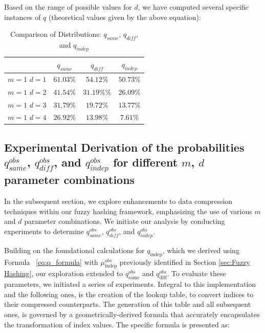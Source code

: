 Based on the range of possible values for \(d\), we have computed several specific instances of \(q\) (theoretical values given by the above equation):
\begin{table}[H]
    \centering
    \renewcommand{\arraystretch}{1.25}\begin{tabular}{|c|c|c|c|}
        \hline
        & $q_{same}$ & $q_{diff}$ & $q_{indep}$\\
        \hline
        \(m = 1\) \(d = 1\) & $61.03\%$ & $54.12\%$ & $50.73\%$\\
        \(m = 1\) \(d = 2\) & $41.54\%$ & $31.19\%\%$ & $26.09\%$\\
        \(m = 1\) \(d = 3\) & $31.79\%$ & $19.72\%$ & $13.77\%$\\
        \(m = 1\) \(d = 4\) & $26.92\%$ & $13.98\%$ & $7.61\%$\\
        \hline
    \end{tabular}
\caption{Comparison of Distributions: $q_{same}$, $q_{diff}$, and $q_{indep}$}
\label{tab:theoretical_q}
\end{table}

\subsection{Experimental Derivation of the probabilities $q_{same}^{obs}$, $q_{diff}^{obs}$, and $q_{indep}^{obs}$ for different \(m\), \(d\) parameter combinations}

In the subsequent section, we explore enhancements to data compression techniques within our fuzzy hashing framework, emphasizing the use of various \(m\) and \(d\) parameter combinations. We initiate our analysis by conducting experiments to determine \(q_{same}^{obs}\), \(q_{diff}^{obs}\), and \(q_{indep}^{obs}\).

Building on the foundational calculations for \(q_{\text{indep}}\), which we derived using Formula ~\ref{eq:q_formula} with \( \mu^{obs}_{\text{indep}} \) previously identified in Section \ref{sec:Fuzzy Hashing}, our exploration extended to \(q^{obs}_{\text{same}}\) and \(q^{obs}_\text{diff}\). To evaluate these parameters, we initiated a series of experiments. Integral to this implementation and the following ones, is the creation of the lookup table, to convert indices to their compressed counterparts. The generation of this table and all subsequent ones, is governed by a geometrically-derived formula that accurately encapsulates the transformation of index values. The specific formula is presented as:

